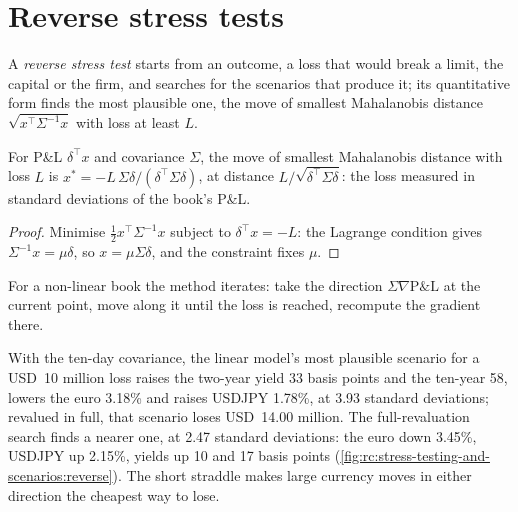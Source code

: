 \section{Reverse stress tests}

\begin{definition}\label{def:rc:stress-testing-and-scenarios:reverse}
A \emph{reverse stress test} starts from an outcome, a loss that would
break a limit, the capital or the firm, and searches for the scenarios that produce it; its
quantitative form finds the most plausible one, the move of smallest Mahalanobis distance
$\sqrt{x^\top\Sigma^{-1}x}$ with loss at least $L$.
\end{definition}

\begin{proposition}\label{prop:rc:stress-testing-and-scenarios:rev}
For P\&L $\delta^\top x$ and covariance $\Sigma$, the move of smallest Mahalanobis distance with loss $L$ is
$x^* = -L\,\Sigma\delta/(\delta^\top\Sigma\delta)$, at distance $L/\sqrt{\delta^\top\Sigma\delta}$: the loss measured in standard
deviations of the book's P\&L.
\end{proposition}
\begin{proof}
Minimise $\tfrac12x^\top\Sigma^{-1}x$ subject to $\delta^\top x = -L$: the Lagrange condition gives $\Sigma^{-1}x = \mu\delta$,
so $x = \mu\Sigma\delta$, and the constraint fixes $\mu$.
\end{proof}

For a non-linear book the method iterates: take the direction $\Sigma\nabla\mathrm{P\&L}$ at the current point,
move along it until the loss is reached, recompute the gradient there.

\begin{example}\label{ex:rc:stress-testing-and-scenarios:rev}
With the ten-day covariance, the linear model's most plausible scenario for a USD~10 million loss
raises the two-year yield 33 basis points and the ten-year 58, lowers the euro 3.18\% and raises
USDJPY 1.78\%, at 3.93 standard deviations; revalued in full, that scenario loses USD~14.00
million. The full-revaluation search finds a nearer one, at 2.47 standard deviations: the euro
down 3.45\%, USDJPY up 2.15\%, yields up 10 and 17 basis points
(\cref{fig:rc:stress-testing-and-scenarios:reverse}). The short straddle makes large currency
moves in either direction the cheapest way to lose.
\end{example}

